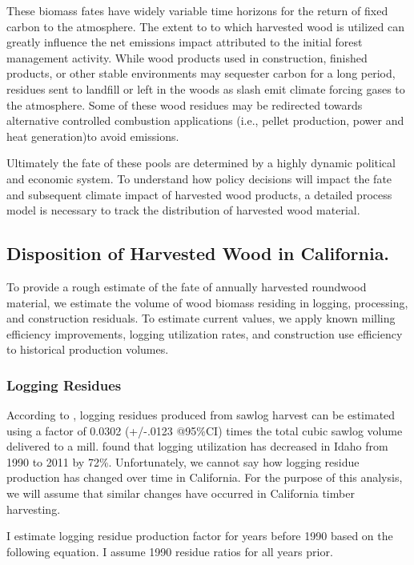 \documentclass[a4paper,titlepage]{article}
\begin{document}
These biomass fates have widely variable time horizons for the return of fixed carbon to the atmosphere. The extent to to which harvested wood is utilized can greatly influence the net emissions impact attributed to the initial forest management activity. While wood products used in construction, finished products, or other stable environments may sequester carbon for a long period, residues sent to landfill or left in the woods as slash emit climate forcing gases to the atmosphere. Some of these wood residues may be redirected towards alternative controlled combustion applications (i.e., pellet production, power and heat generation)to avoid emissions.

Ultimately the fate of these pools are determined by a highly dynamic political and economic system. To understand how policy decisions will impact the fate and subsequent climate impact of harvested wood products, a detailed process model is necessary to track the distribution of harvested wood material.

\subsection{Disposition of Harvested Wood in California.}
\label{sec:orgheadline16}
To provide a rough estimate of the fate of annually harvested roundwood material, we estimate the volume of wood biomass residing in logging, processing, and construction residuals. To estimate current values, we apply known milling efficiency improvements, logging utilization rates, and construction use efficiency to historical production volumes. 
\subsubsection{Logging Residues}
\label{sec:orgheadline11}
According to \citet{Morgan}, logging residues produced from sawlog harvest can be estimated using a factor of 0.0302 (+/-.0123 @95\%CI) times the total cubic sawlog volume delivered to a mill. \citet{Simmons2014} found that logging utilization has decreased in Idaho from 1990 to 2011 by 72\%. Unfortunately, we cannot say how logging residue production has changed over time in California. For the purpose of this analysis, we will assume that similar changes have occurred in California timber harvesting. 

I estimate logging residue production factor for years before 1990 based on the following equation. I assume 1990 residue ratios for all years prior.
\end{document}
